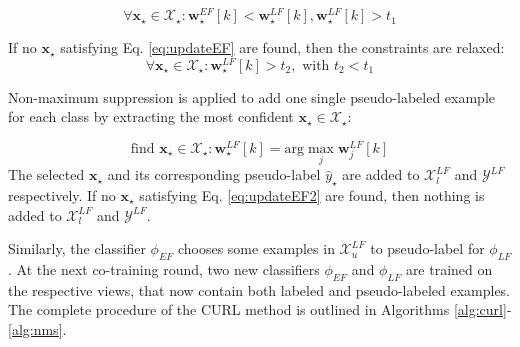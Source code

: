 \documentclass[journal,11pt]{IEEEtran}
\begin{document}
\begin{equation}
\forall \mathbf{x}_\star \in \mathcal{X}_\star: \mathbf{w}_\star^{\scriptscriptstyle EF}[k]<\mathbf{w}_\star^{\scriptscriptstyle LF}[k], \mathbf{w}_\star^{\scriptscriptstyle LF}[k]  > \! t_1
\label{eq:updateEF}
\end{equation}

If no $\mathbf{x}_\star$ satisfying Eq. \ref{eq:updateEF} are found, then the constraints are relaxed:
\begin{equation}
\forall \mathbf{x}_\star \in \mathcal{X}_\star: \mathbf{w}_\star^{\scriptscriptstyle LF}[k]  > \! t_2, \text{ with } t_2<t_1
\label{eq:updateEF2}
\end{equation}

Non-maximum suppression is applied to add one single pseudo-labeled example for each class by extracting the most confident $\mathbf{x}_\star \in \mathcal{X}_\star$:

\begin{equation}
\text{find } \mathbf{x}_\star  \in  \mathcal{X}_\star : \mathbf{w}_\star^{\scriptscriptstyle LF}[k]  = \displaystyle \text{arg} \! \max_{j} \mathbf{w}_j^{\scriptscriptstyle LF}[k]
\label{eq:coso}
\end{equation}
The selected $\mathbf{x}_\star$ and its corresponding pseudo-label $\hat{y}_\star$ are added to $\mathcal{X}_l^{\scriptscriptstyle LF}$ and $\mathcal{Y}^{\scriptscriptstyle LF}$ respectively. If no $\mathbf{x}_\star$ satisfying Eq. \ref{eq:updateEF2} are found, then nothing is added to $\mathcal{X}_l^{\scriptscriptstyle LF}$ and $\mathcal{Y}^{\scriptscriptstyle LF}$.

Similarly, the classifier $\phi_{\scriptscriptstyle EF}$ chooses some examples in $\mathcal{X}_u^{\scriptscriptstyle LF}$ to pseudo-label for $\phi_{\scriptscriptstyle LF}$.
At the next co-training round, two new classifiers $\phi_{\scriptscriptstyle EF}$ and $\phi_{\scriptscriptstyle LF}$ are trained on the respective views, that now contain both labeled and pseudo-labeled examples.
The complete procedure of the CURL method is outlined in Algorithms \ref{alg:curl}-\ref{alg:nms}.
\end{document}
